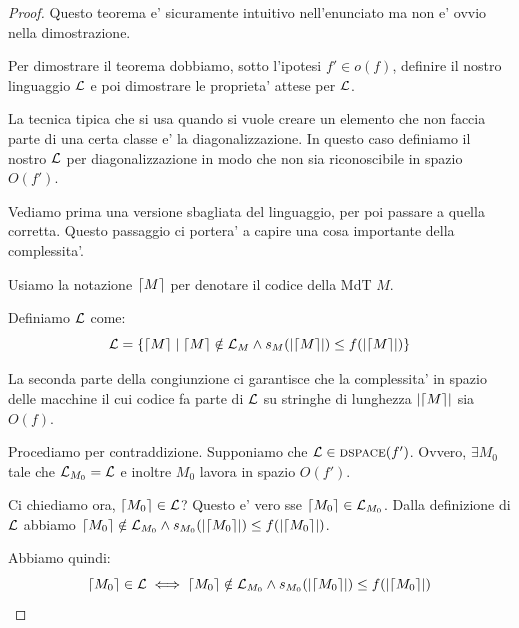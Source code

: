 \begin{proof}
    Questo teorema e' sicuramente intuitivo nell'enunciato ma non e' ovvio nella dimostrazione.

    Per dimostrare il teorema dobbiamo, sotto l'ipotesi $f' \in o(f)$, definire il nostro linguaggio
    $\mathcal{L}$ e poi dimostrare le proprieta' attese per $\mathcal{L}$.


    La tecnica tipica che si usa quando si vuole creare un elemento che non faccia parte di una
    certa classe e' la diagonalizzazione. In questo caso definiamo il nostro $\mathcal{L}$ per
    diagonalizzazione in modo che non sia riconoscibile in spazio $O(f')$.

    Vediamo prima una versione sbagliata del linguaggio, per poi passare a quella corretta. Questo
    passaggio ci portera' a capire una cosa importante della complessita'.

    Usiamo la notazione $\lceil M \rceil$ per denotare il codice della MdT $M$.

    Definiamo $\mathcal{L}$ come:
    \begin{equation*}
        \mathcal{L} = \{\lceil M \rceil \mid \lceil M \rceil \notin \mathcal{L}_{M} \land s_{M}(|\lceil M \rceil|) \leq f(|\lceil M \rceil|)\}
    \end{equation*}

    La seconda parte della congiunzione ci garantisce che la complessita' in spazio delle macchine
    il cui codice fa parte di $\mathcal{L}$ su stringhe di lunghezza $|\lceil M \rceil|$ sia $O(f)$.

    Procediamo per contraddizione. Supponiamo che $\mathcal{L} \in \textsc{dspace}(f')$. Ovvero, $\exists M_{0}$ tale
    che $\mathcal{L}_{M_{0}} = \mathcal{L}$ e inoltre $M_{0}$ lavora in spazio $O(f')$.

    Ci chiediamo ora, $\lceil M_{0} \rceil \in \mathcal{L}$? Questo e' vero sse $\lceil M_{0} \rceil \in \mathcal{L}_{M_{0}}$.
    Dalla definizione di $\mathcal{L}$ abbiamo $\lceil M_{0} \rceil \notin \mathcal{L}_{M_{0}} \land
    s_{M_{0}}(|\lceil M_{0} \rceil|) \leq f(|\lceil M_{0} \rceil|)$. 

    Abbiamo quindi:
    \begin{equation*}
        \lceil M_{0} \rceil \in \mathcal{L} \iff \lceil M_{0} \rceil \notin \mathcal{L}_{M_{0}} \land s_{M_{0}}(|\lceil M_{0} \rceil|)
        \leq f(|\lceil M_{0} \rceil|)
    \end{equation*}


\end{proof}
